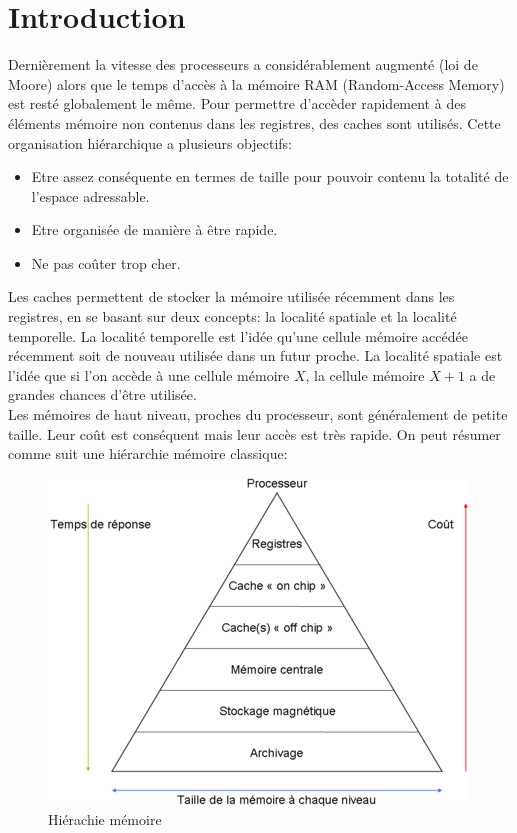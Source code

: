 \documentclass[a4paper]{article}
\begin{document}


\newpage
\tableofcontents

\newpage
\section*{Introduction}

\indent Dernièrement la vitesse des processeurs a considérablement augmenté (loi de Moore) alors que le temps d'accès à la mémoire RAM (Random-Access Memory) est resté globalement le même. Pour permettre d'accèder rapidement à des éléments mémoire non contenus dans les registres, des caches sont utilisés. Cette organisation hiérarchique a plusieurs objectifs: \\
\begin{itemize}
\item Etre assez conséquente en termes de taille pour pouvoir contenu la totalité de l'espace adressable.
\item Etre organisée de manière à être rapide.
\item Ne pas coûter trop cher. \\
\end{itemize}

\indent Les caches permettent de stocker la mémoire utilisée récemment dans les registres, en se basant sur deux concepts: la localité spatiale et la localité temporelle. La localité temporelle est l'idée qu'une cellule mémoire accédée récemment soit de nouveau utilisée dans un futur proche. La localité spatiale est l'idée que si l'on accède à une cellule mémoire $X$, la cellule mémoire $X+1$ a de grandes chances d'être utilisée. \\

\indent Les mémoires de haut niveau, proches du processeur, sont généralement de petite taille. Leur coût est conséquent mais leur accès est très rapide. On peut résumer comme suit une hiérarchie mémoire classique: \\

\begin{figure}[!h]
\begin{center}
   \includegraphics[scale=0.75]{hierarchy.png}
   \caption{\label{hierarchy} Hiérachie mémoire}
\end{center}
\end{figure}

\newpage
\nocite{*}


\end{document}
